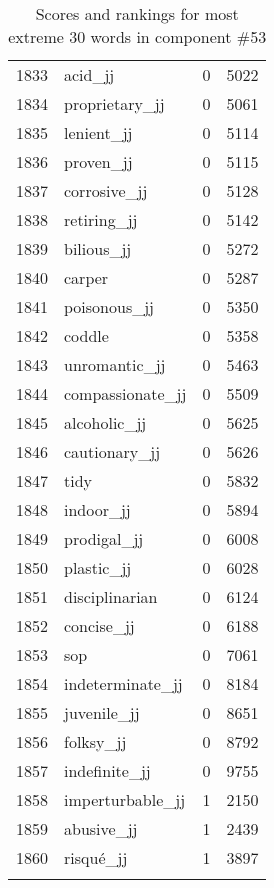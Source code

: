 \begin{longtable}[!htbp]{| rlr@{.}l |}
    1833 & acid\_jj & 0 & 5022 \\
    1834 & proprietary\_jj & 0 & 5061 \\
    1835 & lenient\_jj & 0 & 5114 \\
    1836 & proven\_jj & 0 & 5115 \\
    1837 & corrosive\_jj & 0 & 5128 \\
    1838 & retiring\_jj & 0 & 5142 \\
    1839 & bilious\_jj & 0 & 5272 \\
    1840 & carper & 0 & 5287 \\
    1841 & poisonous\_jj & 0 & 5350 \\
    1842 & coddle & 0 & 5358 \\
    1843 & unromantic\_jj & 0 & 5463 \\
    1844 & compassionate\_jj & 0 & 5509 \\
    1845 & alcoholic\_jj & 0 & 5625 \\
    1846 & cautionary\_jj & 0 & 5626 \\
    1847 & tidy & 0 & 5832 \\
    1848 & indoor\_jj & 0 & 5894 \\
    1849 & prodigal\_jj & 0 & 6008 \\
    1850 & plastic\_jj & 0 & 6028 \\
    1851 & disciplinarian & 0 & 6124 \\
    1852 & concise\_jj & 0 & 6188 \\
    1853 & sop & 0 & 7061 \\
    1854 & indeterminate\_jj & 0 & 8184 \\
    1855 & juvenile\_jj & 0 & 8651 \\
    1856 & folksy\_jj & 0 & 8792 \\
    1857 & indefinite\_jj & 0 & 9755 \\
    1858 & imperturbable\_jj & 1 & 2150 \\
    1859 & abusive\_jj & 1 & 2439 \\
    1860 & risqué\_jj & 1 & 3897 \\
    \hline
    \caption{Scores and rankings for most extreme 30 words in component \#53} \\
\end{longtable}
